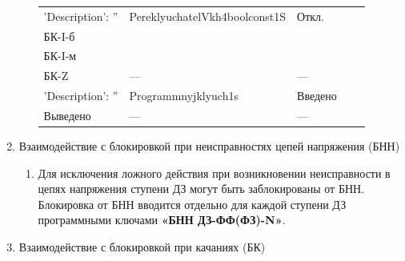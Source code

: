 \begin{enumerate}[label=\arabic{section}.\arabic{subsection}.\arabic{enumi}, labelsep=4pt, leftmargin=0pt, itemindent=57pt, itemsep=0pt, parsep=5pt]
\begin{enumerate}[label=\arabic{section}.\arabic{subsection}.\arabic{enumi}.\arabic*, labelsep=4pt, leftmargin=0em, itemindent=65pt, parsep=0pt]
\begin{longtable}{|>{\centering\arraybackslash}m{5.3cm}|>{\centering\arraybackslash}m{3.3cm}|>{\centering\arraybackslash}m{4.2cm}|>{\centering\arraybackslash}m{1.8cm}|>{\centering\arraybackslash}m{1cm}|}
\hline
\raggedright {'Description': ''} & \centering PereklyuchatelVkh4boolconst1S & \centering Откл. \\ БК-I-б \\ БК-I-м \\ БК-Z & \centering --- & \centering \arraybackslash --- \\
\hline
\raggedright {'Description': ''} & \centering Programmnyjklyuch1s & \centering Введено \\ Выведено & \centering --- & \centering \arraybackslash --- \\
\hline
\end{longtable}
\normalsize

\end{enumerate}


\item\label{sec:secbnn} Взаимодействие с блокировкой при неисправностях цепей напряжения (БНН)
\begin{enumerate}[label=\arabic{section}.\arabic{subsection}.\arabic{enumi}.\arabic*, labelsep=4pt, leftmargin=0em, itemindent=65pt, parsep=0pt]

\item
Для исключения ложного действия при возникновении неисправности в цепях напряжения ступени ДЗ могут быть заблокированы от БНН. Блокировка от БНН вводится отдельно для каждой ступени ДЗ программными ключами \textbf{«БНН ДЗ-ФФ(ФЗ)-N»}.

\end{enumerate}


\item\label{sec:secbk} Взаимодействие с блокировкой при качаниях (БК)
\begin{enumerate}[label=\arabic{section}.\arabic{subsection}.\arabic{enumi}.\arabic*, labelsep=4pt, leftmargin=0em, itemindent=65pt, parsep=0pt]


\end{enumerate}
\end{enumerate}
